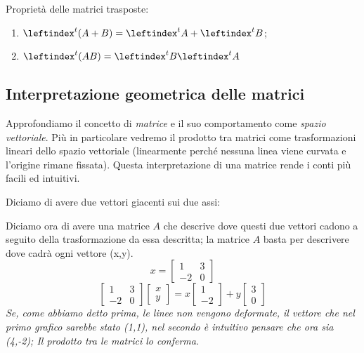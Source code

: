 \documentclass[x11names]{article}
\begin{document}
Proprietà delle matrici trasposte:
\begin{enumerate}
\item $\leftindex^t{\left(A+B\right)} = \leftindex^t{A} + \leftindex^t{B}$;
\item $\leftindex^t{(AB)} = \leftindex^t{B} \leftindex^t{A}$
\end{enumerate}

\subsection*{Interpretazione geometrica delle matrici}
Approfondiamo il concetto di \textit{matrice} e il suo comportamento come \textit{spazio vettoriale}. Più in particolare vedremo il prodotto tra matrici come trasformazioni lineari dello spazio vettoriale (linearmente perché nessuna linea viene curvata e l'origine rimane fissata). Questa interpretazione di una matrice rende i conti più facili ed intuitivi. 

\noindent
Diciamo di avere due vettori giacenti sui due assi:

\begin{center}

\end{center}

\noindent
Diciamo ora di avere una matrice $A$ che descrive dove questi due vettori cadono a seguito della trasformazione da essa descritta; la matrice $A$ basta per descrivere dove cadrà ogni vettore (x,y). 
$$
x=\begin{bmatrix}
    1 & 3 \\
    -2 & 0 
\end{bmatrix}
$$
$$
\begin{bmatrix}
   1 & 3 \\
   -2 & 0 
\end{bmatrix}
\begin{bmatrix}
    x \\
    y
\end{bmatrix}
= x
\begin{bmatrix}
    1\\-2
\end{bmatrix}
+ y
\begin{bmatrix}
    3 \\  0
\end{bmatrix}
$$
\textit{Se, come abbiamo detto prima, le linee non vengono deformate, il vettore che nel primo grafico sarebbe stato (1,1), nel secondo è intuitivo pensare che ora sia (4,-2); Il prodotto tra le matrici lo conferma}.
\end{document}
